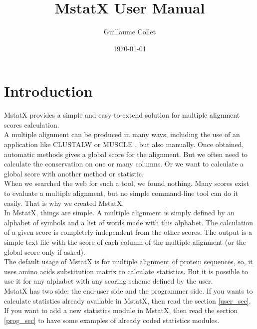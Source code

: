 \documentclass[12pt]{report}
\title{MstatX User Manual}
\author{Guillaume Collet}
\date{\today}
\begin{document}
\maketitle
\thispagestyle{empty} \newpage

\thispagestyle{empty}  \null \newpage

\setcounter{tocdepth}{3}
\tableofcontents
\thispagestyle{empty} 
\newpage

\setcounter{page}{1}
\section{Introduction}
MstatX provides a simple and easy-to-extend solution for multiple alignment scores calculation.\\

A multiple alignment can be produced in many ways, including the use of an application like CLUSTALW 
\cite{Larkin-2007} or MUSCLE \cite{Edgar0-2004}, but also manually. Once obtained, automatic methods 
gives a global score for the alignment. But we often need to calculate the conservation on one or many 
columns. Or we want to calculate a global score with another method or statistic.\\

When we searched the web for such a tool, we found nothing. Many scores exist to evaluate a multiple 
alignment, but no simple command-line tool can do it easily. That is why we created MstatX.\\

In MstatX, things are simple. A multiple alignment is simply defined by an alphabet of symbols and a list 
of words made with this alphabet. The calculation of a given score is completely independent from the 
other scores. The output is a simple text file with the score of each column of the multiple alignment (or the
global score only if asked).\\

The default usage of MstatX is for multiple alignment of protein sequences, so, it uses amino acids substitution 
matrix to calculate statistics. But it is possible to use it for any alphabet with any scoring scheme defined by 
the user.\\

MstatX has two side: the end-user side and the programmer side. 
If you wants to calculate statistics already available in MstatX, then read the section \ref{user_sec}. 
If you want to add a new statistics module in MstatX, then read the section \ref{prog_sec} to have some examples of
already coded statistics modules.
\end{document}
